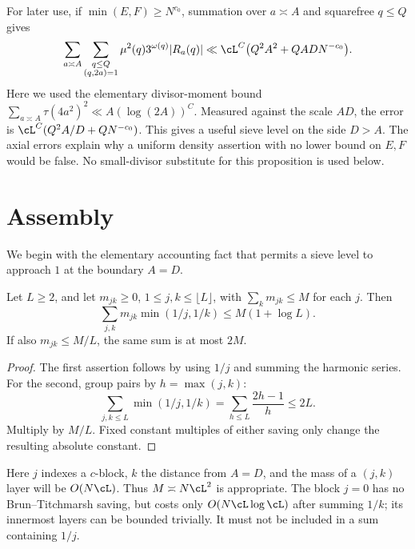 For later use, if $\min(E,F)\geq N^{c_0}$, summation over $a\asymp A$
and squarefree $q\leq Q$ gives
\begin{equation}\label{C:eq:Ka-summed}
 \sum_{a\asymp A}\sum_{\substack{q\leq Q\\(q,2a)=1}}
 \mu^2(q)3^{\omega(q)}|R_a(q)|
 \ll\cL^C\bigl(Q^2A^2+QADN^{-c_0}\bigr).
\end{equation}
Here we used the elementary divisor-moment bound
$\sum_{a\asymp A}\tau(4a^2)^2\ll A(\log(2A))^C$.
Measured against the scale $AD$, the error is
$\cL^C(Q^2A/D+QN^{-c_0})$.  This gives a useful sieve level on the
side $D>A$.  The axial errors explain why a uniform density assertion
with no lower bound on $E,F$ would be false.  No small-divisor substitute
for this proposition is used below.

\section{Assembly}\label{sec:assembly}
We begin with the elementary accounting fact that permits a sieve level
to approach $1$ at the boundary $A=D$.

\begin{lemma}\label{L:1.1}
Let $L\geq2$, and let $m_{jk}\geq0$, $1\leq j,k\leq\lfloor L\rfloor$,
with $\sum_km_{jk}\leq M$ for each $j$.  Then
\[
 \sum_{j,k}m_{jk}\min(1/j,1/k)\leq M(1+\log L).
\]
If also $m_{jk}\leq M/L$, the same sum is at most $2M$.
\end{lemma}
\begin{proof}
The first assertion follows by using $1/j$ and summing the harmonic
series.  For the second, group pairs by $h=\max(j,k)$:
\[
 \sum_{j,k\leq L}\min(1/j,1/k)
 =\sum_{h\leq L}\frac{2h-1}{h}\leq2L.
\]
Multiply by $M/L$.  Fixed constant multiples of either saving only
change the resulting absolute constant.
\end{proof}
Here $j$ indexes a $c$-block, $k$ the distance from $A=D$, and the mass
of a $(j,k)$ layer will be $O(N\cL)$.  Thus $M\asymp N\cL^2$ is
appropriate.  The block $j=0$ has no Brun--Titchmarsh saving, but costs
only $O(N\cL\log\cL)$ after summing $1/k$; its innermost layers can
be bounded trivially.  It must not be included in a sum containing $1/j$.

